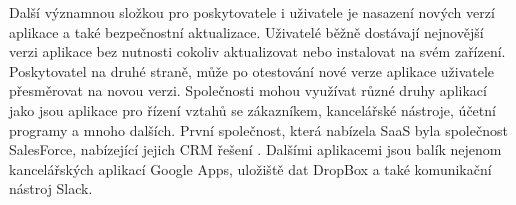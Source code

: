 Další významnou složkou pro poskytovatele i uživatele je nasazení nových verzí aplikace a také bezpečnostní aktualizace. Uživatelé běžně dostávají nejnovější verzi aplikace bez nutnosti cokoliv aktualizovat nebo instalovat na svém zařízení. Poskytovatel na druhé straně, může po otestování nové verze aplikace uživatele přesměrovat na novou verzi.\newline 
Společnosti mohou využívat různé druhy aplikací jako jsou aplikace pro řízení vztahů se zákazníkem, kancelářské nástroje, účetní programy a mnoho dalších. První společnost, která nabízela SaaS byla společnost SalesForce, nabízející jejich CRM řešení \cite{salesforce2018}. Dalšími aplikacemi jsou balík nejenom kancelářských aplikací Google Apps, uložiště dat DropBox a také komunikační nástroj Slack.


